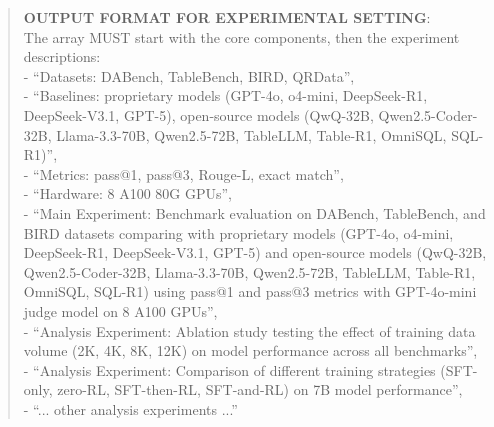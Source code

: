 \begin{quote}
\begin{tcolorbox}[breakable,colback=extraction!20!white, colframe=extraction!60!black, title=\textbf{Prompt for Extraction Agent}]
        \textbf{OUTPUT FORMAT FOR EXPERIMENTAL SETTING}:\\
        The array MUST start with the core components, then the experiment descriptions:\\
        - ``Datasets: DABench, TableBench, BIRD, QRData'',\\
        - ``Baselines: proprietary models (GPT-4o, o4-mini, DeepSeek-R1, DeepSeek-V3.1, GPT-5), open-source models (QwQ-32B, Qwen2.5-Coder-32B, Llama-3.3-70B, Qwen2.5-72B, TableLLM, Table-R1, OmniSQL, SQL-R1)'',\\
        - ``Metrics: pass@1, pass@3, Rouge-L, exact match'',\\
        - ``Hardware: 8 A100 80G GPUs'',\\
        - ``Main Experiment: Benchmark evaluation on DABench, TableBench, and BIRD datasets comparing with proprietary models (GPT-4o, o4-mini, DeepSeek-R1, DeepSeek-V3.1, GPT-5) and open-source models (QwQ-32B, Qwen2.5-Coder-32B, Llama-3.3-70B, Qwen2.5-72B, TableLLM, Table-R1, OmniSQL, SQL-R1) using pass@1 and pass@3 metrics with GPT-4o-mini judge model on 8 A100 GPUs'',\\
        - ``Analysis Experiment: Ablation study testing the effect of training data volume (2K, 4K, 8K, 12K) on model performance across all benchmarks'',\\
        - ``Analysis Experiment: Comparison of different training strategies (SFT-only, zero-RL, SFT-then-RL, SFT-and-RL) on 7B model performance'',\\
        - ``... other analysis experiments ...''\\


\end{tcolorbox}
\end{quote}
